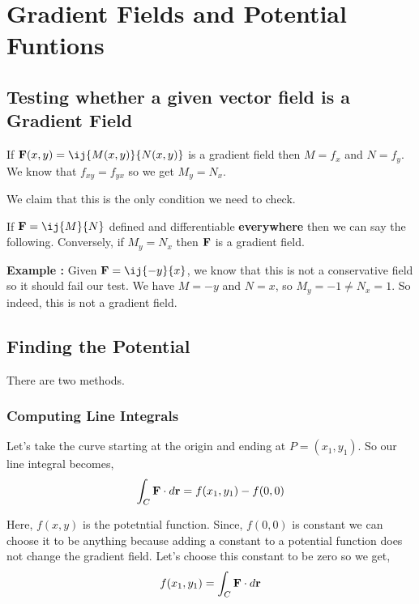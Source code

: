 

\chapter{Gradient Fields and Potential Funtions}

\bigbreak

\section{Testing whether a given vector field is a Gradient Field}

If ${\bf F}(x, y) = \ij{M(x, y)}{N(x, y)}$ is a gradient field then $M = f_x$ and $N = f_y$.
We know that $f_{xy} = f_{yx}$ so we get $M_y = N_x$.

We claim that this is the only condition we need to check.

If ${\bf F} = \ij{M}{N}$ defined and differentiable {\bf everywhere} then we can say the following.
Conversely, if $M_y  = N_x$ then ${\bf F}$ is a gradient field.

{\bf Example : } Given ${\bf F} = \ij{-y}{x}$, we know that this is not a conservative field so it should fail our test.
We have $M = - y$ and $N = x$, so $M_y = -1 \neq N_x = 1$. So indeed, this is  not a gradient field.

\section{Finding the Potential}

There are two methods. 

\subsection{Computing Line Integrals}

Let's take the curve starting at the origin and ending at $P = (x_1, y_1)$.
So our line integral becomes,
$$
\int_C {\bf F} \cdot d{\bf r} = f(x_1, y_1) - f(0, 0)
$$

Here, $f(x,y)$ is the potetntial function.
Since, $f(0, 0)$ is constant we can choose it to be anything because adding a constant to a potential function does not change the gradient field.
Let's choose this constant to be zero so we get,
$$
f(x_1, y_1) = \int_C {\bf F} \cdot d{\bf r}
$$

